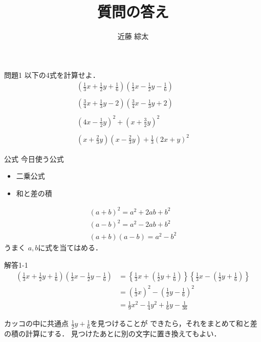 \documentclass[dvipdfmx]{beamer}
\title{質問の答え}
\author{近藤 綜太}
\begin{document}
	\maketitle
	\begin{frame}{問題1}
		以下の4式を計算せよ．
		\begin{gather}
			\left(
				\frac{1}{3}x + \frac{1}{2}y + \frac{1}{6}
			\right)
			\left(
				\frac{1}{3}x - \frac{1}{2}y - \frac{1}{6}
			\right)\\ \nonumber \\
			\left(
				\frac{3}{4}x + \frac{1}{3}y - 2
			\right)
			\left(
				\frac{3}{4}x - \frac{1}{3}y + 2
			\right)\\ \nonumber\\
			\left(
				4x - \frac{1}{2}y
			\right)^2 + 
			\left(
				x + \frac{3}{2}y
			\right)^2\\ \nonumber\\
			\left(
				x + \frac{2}{3}y
			\right)
			\left(
				x - \frac{2}{3}y
			\right)
			+ \frac{1}{3}(2x + y)^2
		\end{gather}
	\end{frame}

	\begin{frame}{公式}
		今日使う公式
		\begin{itemize}
			\item 二乗公式
			\item 和と差の積
		\end{itemize}
		\begin{gather*}
			(a+b)^2 = a^2+ 2ab +b^2\\
			(a-b)^2 = a^2- 2ab +b^2\\
			(a+b)(a-b) = a^2-b^2
		\end{gather*}
	うまく $a, b$に式を当てはめる．
	\end{frame}

	\begin{frame}{解答1-1}
		\begin{align*}
			\left(
				\frac{1}{3}x + \frac{1}{2}y + \frac{1}{6}
			\right)
			\left(
				\frac{1}{3}x - \frac{1}{2}y - \frac{1}{6}
			\right)
			&= \left\{ \frac{1}{3}x 
				+ \left( \frac{1}{2}y + \frac{1}{6}\right)
			\right\}
			\left\{ \frac{1}{3}x 
				- \left( \frac{1}{2}y + \frac{1}{6}\right)
			\right\}\\
			&=\left( \frac{1}{3}x\right)^2 - \left( \frac{1}{2}y - \frac{1}{6}\right)^2\\
			&= \frac{1}{9}x^2  
			-\frac{1}{4}y^2
			+ \frac{1}{6}y
			- \frac{1}{36}
		\end{align*}

		カッコの中に共通点 $ \frac{1}{2}y + \frac{1}{6}$を見つけることが
		できたら，それをまとめて和と差の積の計算にする．
		見つけたあとに別の文字に置き換えてもよい．
	\end{frame}
\end{document}
